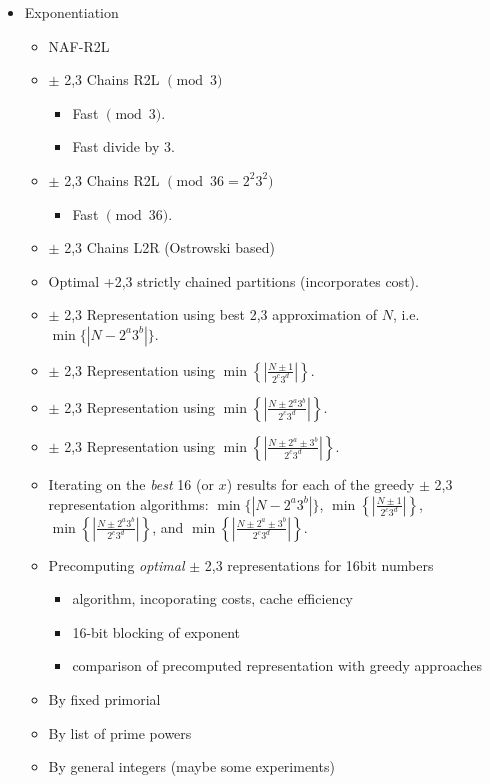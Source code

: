 \documentclass[11pt, letterpaper]{article}
\theoremstyle{definition}
\begin{document}
\begin{itemize}
\item Exponentiation
	\begin{itemize}
	\item NAF-R2L
	\item $\pm$ 2,3 Chains R2L $\pmod{3}$
		\begin{itemize}
		\item Fast $\pmod 3$.
		\item Fast divide by 3.
		\end{itemize}
	\item $\pm$ 2,3 Chains R2L $\pmod{36=2^2 3^2}$
		\begin{itemize}
		\item Fast $\pmod{36}$.
		\end{itemize}
	\item $\pm$ 2,3 Chains L2R (Ostrowski based)
	\item Optimal +2,3 strictly chained partitions (incorporates cost).
	\item $\pm$ 2,3 Representation using best 2,3 approximation of $N$, i.e. $\min \{|N-2^a3^b|\}$.
	\item $\pm$ 2,3 Representation using $\min \left\{ \left| \frac{N \pm 1}{2^c3^d} \right| \right\}$.
	\item $\pm$ 2,3 Representation using $\min \left\{ \left| \frac{N \pm 2^a3^b}{2^c3^d} \right| \right\}$.
	\item $\pm$ 2,3 Representation using $\min \left\{ \left| \frac{N \pm 2^a \pm 3^b}{2^c3^d} \right| \right\}$.
	\item Iterating on the \emph{best} 16 (or $x$) results for each of the greedy $\pm$ 2,3 representation algorithms: $\min \{|N-2^a3^b|\}$, $\min \left\{ \left| \frac{N \pm 1}{2^c3^d} \right| \right\}$, $\min \left\{ \left| \frac{N \pm 2^a3^b}{2^c3^d} \right| \right\}$, and $\min \left\{ \left| \frac{N \pm 2^a \pm 3^b}{2^c3^d} \right| \right\}$.
	\item Precomputing \emph{optimal} $\pm$ 2,3 representations for 16bit numbers
		\begin{itemize}
		\item algorithm, incoporating costs, cache efficiency
		\item 16-bit blocking of exponent
		\item comparison of precomputed representation with greedy approaches
		\end{itemize}
	
	\item By fixed primorial
	\item By list of prime powers
	\item By general integers (maybe some experiments)
	\end{itemize}
\end{itemize}
\end{document}
